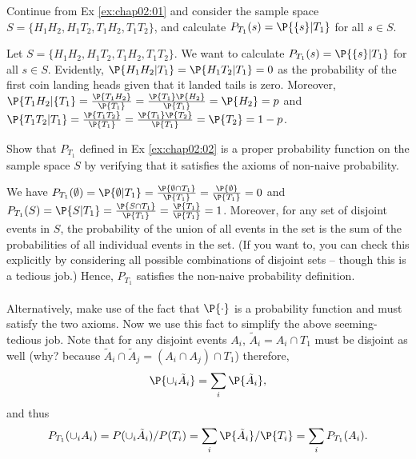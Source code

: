 	\begin{exercise}\label{ex:chap02:02}
		Continue from Ex \ref{ex:chap02:01} and consider the sample space $S=\{H_1H_2, H_1T_2, T_1H_2, T_1T_2\}$, and calculate 
		$P_{T_1}(s)=\P{\{s\}|T_1}$ for all $s\in S$.  

		\begin{solution}
			Let $S = \{H_1H_2, H_1T_2, T_1H_2, T_1T_2\}$. We want to calculate $P_{T_1}(s) = \P{\{s\}|T_1}$ for all $s \in S$. Evidently, $\P{H_1H_2 | T_1} = \P{H_1T_2 | T_1} = 0$ as the probability of the first coin landing heads given that it landed tails is zero. Moreover, $\P{T_1H_2 | \{T_1} = \frac{\P{T_1H_2}}{\P{T_1}} = \frac{\P{T_1} \P{H_2}}{\P{T_1}} = \P{H_2} = p$ and $\P{T_1T_2 | T_1} = \frac{\P{T_1T_2}}{\P{T_1}} = \frac{\P{T_1} \P{T_2}}{\P{T_1}} = \P{T_2} = 1 - p$.
		\end{solution}
	\end{exercise}
	
	\begin{exercise}\label{ex:chap02:03}
		Show that $P_{T_1}$ defined in Ex \ref{ex:chap02:02} is a proper probability function on the sample space $S$ by verifying that it satisfies the axioms of non-naive probability. 
		\begin{solution}
			We have $P_{T_1}(\emptyset) = \P{\emptyset | T_1} = \frac{\P{\emptyset \cap T_1}}{\P{T_1}} = \frac{\P{\emptyset}}{\P{T_1}} = 0$ and $P_{T_1}(S) = \P{S | T_1} = \frac{\P{S \cap T_1}}{\P{T_1}} = \frac{\P{T_1}}{\P{T_1}} = 1$. Moreover, for any set of disjoint events in $S$, the probability of the union of all events in the set is the sum of the probabilities of all individual events in the set. (If you want to, you can check this explicitly by considering all possible combinations of disjoint sets -- though this is a tedious job.) Hence, $P_{T_1}$ satisfies the non-naive probability definition.\\~\\
			Alternatively, make use of the fact that $\P{\cdot}$ is a probability function and must satisfy the two axioms. Now we use this fact to simplify the above seeming-tedious job. Note that for any disjoint events $A_i$, $\tilde{A}_i=A_i\cap T_1$ must be disjoint as well (why? because $\tilde{A}_i\cap \tilde{A}_j=(A_i\cap A_j)\cap T_1$) therefore, $$\P{\cup_i \tilde{A}_i}=\sum_i \P{\tilde{A}_i},$$ and thus $$P_{T_1}{(\cup_i A_i)}= P(\cup_i \tilde{A}_i) /P(T_i)=\sum_i \P{\tilde{A}_i}/\P{T_i}=\sum_i P_{T_1}{(A_i)}.$$
		\end{solution}
	\end{exercise}
	
